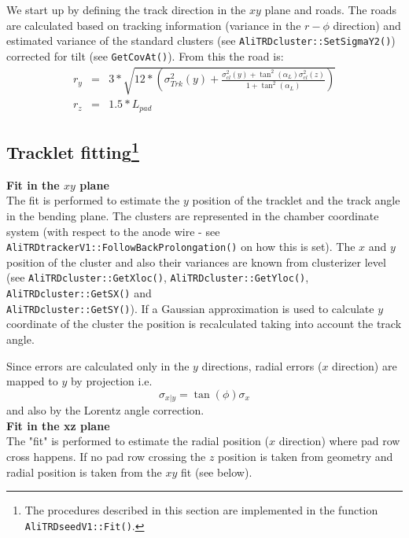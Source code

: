 \documentclass{alicetdr}
\begin{document}
We start up by defining the track direction in the $xy$ plane and roads. The 
roads are calculated based on tracking information (variance in the $r-\phi$ 
direction) and estimated variance of the standard clusters (see 
{\tt AliTRDcluster::SetSigmaY2()}) corrected for tilt (see {\tt GetCovAt()}). 
From this the road is:
\begin{eqnarray}
r_{y} &=& 3*\sqrt{12*(\sigma^{2}_{Trk}(y) + \frac{\sigma^{2}_{cl}(y) 
+ \tan^{2}(\alpha_{L})\sigma^{2}_{cl}(z)}{1+\tan^{2}(\alpha_{L})})}\\
r_{z} &= &1.5*L_{pad}
\end{eqnarray}

\subsection[Tracklet fitting]{Tracklet fitting\footnote{The procedures described in this 
section are implemented in the function 
{\tt AliTRDseedV1::Fit()}.}}\label{REC:Tracking:TrackletFit}

\noindent
{\bf Fit in the $xy$ plane}
\\

The fit is performed to estimate the $y$ position of the tracklet and the track 
angle in the bending plane. The clusters are represented in the chamber coordinate 
system (with respect to the anode wire - see 
{\tt AliTRDtrackerV1::FollowBackProlongation()} on how this is set). The $x$ and $y$ 
position of the cluster and also their variances are known from clusterizer level 
(see {\tt AliTRDcluster::GetXloc()}, 
{\tt AliTRDcluster::GetYloc()}, {\tt AliTRDcluster::GetSX()} and \\
{\tt AliTRDcluster::GetSY()}). If a Gaussian approximation is used to calculate 
$y$ coordinate of the cluster the position is recalculated taking into account the 
track angle.

Since errors are calculated only in the $y$ directions, radial errors ($x$ direction) 
are mapped to $y$ by projection i.e.
\begin{equation}
\sigma_{x|y} = \tan(\phi) \sigma_{x}
\end{equation}
and also by the Lorentz angle correction.
\\

\noindent
{\bf Fit in the xz plane}
\\

The "fit" is performed to estimate the radial position ($x$ direction) where pad 
row cross happens. If no pad row crossing the $z$ position is taken from geometry 
and radial position is taken from the $xy$ fit (see below).
\end{document}
